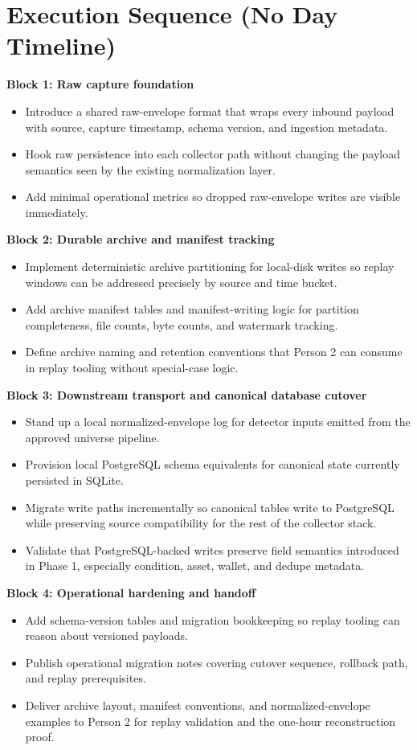 \documentclass{article}
\begin{document}
\section*{Execution Sequence (No Day Timeline)}
\textbf{Block 1: Raw capture foundation}
\begin{itemize}
\item Introduce a shared raw-envelope format that wraps every inbound payload with source, capture timestamp, schema version, and ingestion metadata.
\item Hook raw persistence into each collector path without changing the payload semantics seen by the existing normalization layer.
\item Add minimal operational metrics so dropped raw-envelope writes are visible immediately.
\end{itemize}

\textbf{Block 2: Durable archive and manifest tracking}
\begin{itemize}
\item Implement deterministic archive partitioning for local-disk writes so replay windows can be addressed precisely by source and time bucket.
\item Add archive manifest tables and manifest-writing logic for partition completeness, file counts, byte counts, and watermark tracking.
\item Define archive naming and retention conventions that Person 2 can consume in replay tooling without special-case logic.
\end{itemize}

\textbf{Block 3: Downstream transport and canonical database cutover}
\begin{itemize}
\item Stand up a local normalized-envelope log for detector inputs emitted from the approved universe pipeline.
\item Provision local PostgreSQL schema equivalents for canonical state currently persisted in SQLite.
\item Migrate write paths incrementally so canonical tables write to PostgreSQL while preserving source compatibility for the rest of the collector stack.
\item Validate that PostgreSQL-backed writes preserve field semantics introduced in Phase 1, especially condition, asset, wallet, and dedupe metadata.
\end{itemize}

\textbf{Block 4: Operational hardening and handoff}
\begin{itemize}
\item Add schema-version tables and migration bookkeeping so replay tooling can reason about versioned payloads.
\item Publish operational migration notes covering cutover sequence, rollback path, and replay prerequisites.
\item Deliver archive layout, manifest conventions, and normalized-envelope examples to Person 2 for replay validation and the one-hour reconstruction proof.
\end{itemize}
\end{document}
